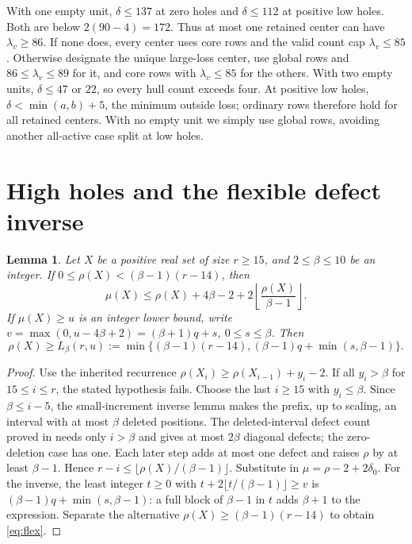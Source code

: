 \documentclass[11pt,a4paper]{article}
\newtheorem{lemma}[theorem]{Lemma}
\begin{document}
With one empty unit, $\delta\le137$ at zero holes and $\delta\le112$
at positive low holes. Both are below $2(90-4)=172$.
Thus at most one retained center can have $\lambda_v\ge86$.
If none does, every center uses core rows and the valid count cap
$\lambda_v\le85$. Otherwise designate the unique large-loss center,
use global rows and $86\le\lambda_v\le89$ for it, and core rows with
$\lambda_v\le85$ for the others.
With two empty units, $\delta\le47$ or $22$, so every hull count exceeds
four. At positive low holes, $\delta<\min(a,b)+5$, the minimum outside
loss; ordinary rows therefore hold for all retained centers.
With no empty unit we simply use global rows, avoiding another
all-active case split at low holes.

\section{High holes and the flexible defect inverse}
\begin{lemma}\label{lem:flex}
Let $X$ be a positive real set of size $r\ge15$, and $2\le\beta\le10$
be an integer. If $0\le\rho(X)<(\beta-1)(r-14)$, then
\[
 \mu(X)\le\rho(X)+4\beta-2+
                   2\left\lfloor\frac{\rho(X)}{\beta-1}\right\rfloor.
\]
If $\mu(X)\ge u$ is an integer lower bound, write
$v=\max(0,u-4\beta+2)=(\beta+1)q+s$, $0\le s\le\beta$. Then
\begin{equation}\label{eq:flex}
 \rho(X)\ge L_\beta(r,u):=
 \min\{(\beta-1)(r-14),(\beta-1)q+\min(s,\beta-1)\}.
\end{equation}
\end{lemma}
\begin{proof}
Use the inherited recurrence
$\rho(X_i)\ge\rho(X_{i-1})+y_i-2$.
If all $y_i>\beta$ for $15\le i\le r$, the stated hypothesis fails.
Choose the last $i\ge15$ with $y_i\le\beta$. Since $\beta\le i-5$,
the small-increment inverse lemma makes the prefix, up to scaling,
an interval with at most $\beta$ deleted positions.
The deleted-interval defect count proved in \cite{base98} needs only
$i>\beta$ and gives at most $2\beta$ diagonal defects; the zero-deletion
case has one. Each later step adds at most one defect and raises $\rho$
by at least $\beta-1$. Hence
$r-i\le\lfloor\rho(X)/(\beta-1)\rfloor$. Substitute in
$\mu=\rho-2+2\delta_0$.
For the inverse, the least integer $t\ge0$ with
$t+2\lfloor t/(\beta-1)\rfloor\ge v$ is
$(\beta-1)q+\min(s,\beta-1)$: a full block of $\beta-1$ in $t$
adds $\beta+1$ to the expression. Separate the alternative
$\rho(X)\ge(\beta-1)(r-14)$ to obtain \eqref{eq:flex}.
\end{proof}
\end{document}
